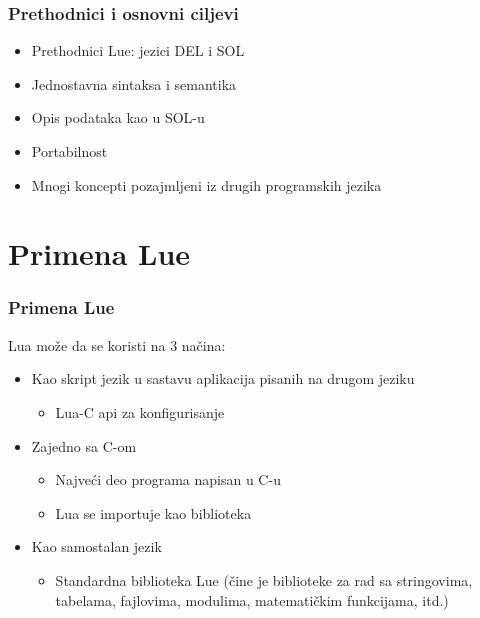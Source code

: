 \documentclass{beamer}
\begin{document}
\begin{frame}
\frametitle{Prethodnici i osnovni ciljevi}

\begin{itemize}
\item Prethodnici Lue: jezici DEL i SOL

\item Jednostavna sintaksa i semantika

\item Opis podataka  kao  u  SOL-u   

\item Portabilnost  

\item  Mnogi koncepti pozajmljeni iz drugih programskih jezika

\end{itemize}
\end{frame}


\section{Primena Lue}
\begin{frame}
\frametitle{Primena Lue}

Lua može da se koristi na 3 načina:

\begin{itemize}

\item Kao skript jezik u sastavu aplikacija pisanih na drugom jeziku
\begin{itemize}
\item Lua-C api za konfigurisanje
\end{itemize}

\item Zajedno sa C-om
\begin{itemize}
\item Najveći deo programa napisan u C-u
\item Lua se importuje kao biblioteka
\end{itemize}

\item Kao samostalan jezik  
\begin{itemize}
\item Standardna biblioteka Lue (čine je biblioteke za rad sa stringovima, tabelama, fajlovima, modulima, matematičkim funkcijama, itd.)
\end{itemize}
 
\end{itemize}

\end{frame}
\end{document}
